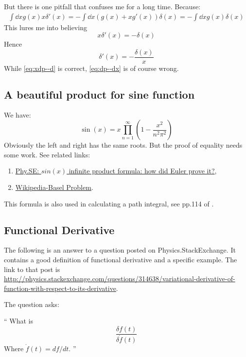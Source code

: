 But there is one pitfall that confuses me for a long time. Because:
\begin{align*}
    \int\dd{x}g(x)x\delta'(x) = -\int\dd{x}(g(x)+xg'(x))\delta(x)
    = -\int\dd{x}g(x)\delta(x)
\end{align*}
This lures me into believing
\begin{equation}
    x\delta'(x) = -\delta(x)
    \label{eq:xdp--d}
\end{equation}
Hence
\begin{equation}
    \delta'(x) = -\frac{\delta(x)}{x}
    \label{eq:dp--dx}
\end{equation}
While \ref{eq:xdp--d} is correct, \ref{eq:dp--dx} is of course wrong.
\subsection{A beautiful product for sine function}

We have:
\begin{equation}
    \sin(x) =  x\prod_{n=1}^\infty \left(1-\frac{x^2}{n^2\pi^2}\right)
\end{equation}
Obviously the left and right has the same roots. But the proof of equality needs
some work. See related links:
\begin{enumerate}
    \item  
        \href{http://math.stackexchange.com/questions/674769/sinx-infinite-product-formula-how-did-euler-prove-it}{Phy.SE:
        $sin(x)$ infinite product formula: how did Euler prove it?},
    \item \href{https://en.wikipedia.org/wiki/Basel_problem}{Wikipedia-Basel Problem}.
\end{enumerate}

This formula is also used in calculating a path integral, see pp.114 of
\cite{Altland2010}.

\subsection{Functional Derivative}

The following is an answer to a question posted on Physics.StackExchange. It
contains a good definition of functional derivative and a specific example. The
link to that post is
\url{http://physics.stackexchange.com/questions/314638/variational-derivative-of-function-with-respect-to-its-derivative}.

The question asks:
\begin{myquote} \enquote{
    What is 
    $$ \frac{\delta f(t)}{\delta \dot{f}(t)} $$
    Where $\dot{f}(t)=df/dt$.
} \end{myquote}


